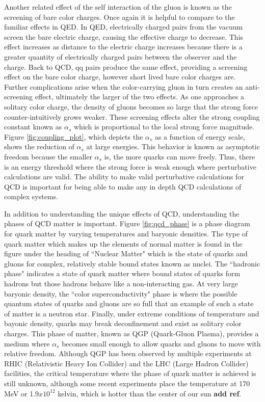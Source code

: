 Another related effect of the self interaction of the gluon is known as the screening of bare color charges. 
Once again it is helpful to compare to the familiar effects in QED. In QED, electrically charged pairs from the vacuum screen the bare electric charge, causing
the effective charge to decrease. This effect increases as distance to the electric charge increases because there is a greater quantity of electrically charged pairs between the observer and the charge. Back to QCD, qq pairs produce the same effect, providing a screening effect on the bare color charge, however short lived bare color charges are. Further complications arise when the color-carrying
gluon in turn creates an anti-screening effect, ultimately the larger of the two effects. As one approaches a solitary color charge, the density of gluons becomes so large that the strong force counter-intuitively grows weaker. These screening effects alter the strong coupling constant known as $\alpha_s$ which is proportional to the local strong force magnitude. Figure \ref{fig:coupling_plot}, which depicts the $\alpha_s$ as a function of energy scale, shows the reduction of $\alpha_s$ at large energies. This behavior is known as asymptotic freedom because the smaller $\alpha_s$ is, the more quarks can move freely. Thus, there is an energy threshold where the strong force is weak enough where perturbative calculations are valid. The ability to make valid perturbative calculations for QCD is important for being able to make any in depth QCD calculations of complex systems.

In addition to understanding the unique effects of QCD, understanding the phases of QCD matter is important. Figure \ref{fig:qcd_phase} is a phase diagram for quark matter by varying temperatures and baryonic densities. The type of quark matter which makes up the elements of normal matter is found in the figure under the heading of ``Nuclear Matter" which is the state of quarks and gluons for complex, relatively stable bound states known as nuclei. The ``hadronic phase" indicates a state of quark matter where bound states of quarks form hadrons but those hadrons behave like a non-interacting gas. At very large baryonic density, the ``color superconductivity" phase is where the possible quantum states of quarks and gluons are so full that an example of such a state of matter is a neutron star. Finally, under extreme conditions of temperature and bayonic density, quarks may break deconfinement and exist as solitary color charges. This phase of matter, known as QGP (Quark-Gluon Plasma), provides a medium where $\alpha_s$ becomes small enough to allow quarks and gluons to move with relative freedom. Although QGP has been observed by multiple experiments at RHIC (Relativistic Heavy Ion Collider) and the LHC (Large Hadron Collider) facilities, the critical temperature where the phase of quark matter is achieved is still unknown, although some recent experiments place the temperature at 170 MeV or 1.9$x10^{12}$ kelvin, which is hotter than the center of our sun \textbf{add ref}.

